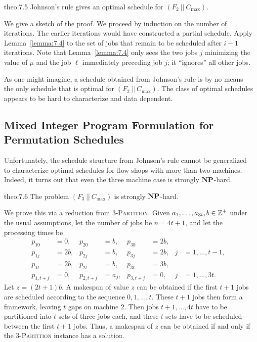 \begin{theo}{theo:7.5}
    Johnson's rule gives an optimal schedule for $(F_2~||~C_{\max})$. 
\end{theo}
\begin{pf}
    We give a sketch of the proof. We proceed by induction on the number 
    of iterations. The earlier iterations would have constructed a 
    partial schedule. Apply Lemma~\ref{lemma:7.4} to the set of jobs 
    that remain to be scheduled after $i-1$ iterations. Note that 
    Lemma~\ref{lemma:7.4} only sees the two jobs $j$ minimizing the 
    value of $\mu$ and the job $\ell$ immediately preceding job $j$; 
    it ``ignores'' all other jobs. 
\end{pf}

As one might imagine, a schedule obtained from Johnson's rule is 
by no means the only schedule that is optimal for $(F_2~||~C_{\max})$. 
The class of optimal schedules appears to be hard to characterize and 
data dependent. 

\subsection{Mixed Integer Program Formulation for Permutation Schedules} \label{subsec:7.3}
Unfortunately, the schedule structure from Johnson's rule cannot be 
generalized to characterize optimal schedules for flow shops with 
more than two machines. Indeed, it turns out that even the three machine case 
is strongly $\operatorname{\textbf{NP}}$-hard. 

\begin{theo}{theo:7.6}
    The problem $(F_3~||~C_{\max})$ is strongly $\operatorname{\textbf{NP}}$-hard. 
\end{theo}
\begin{pf}
    We prove this via a reduction from \textsc{$3$-Partition}. Given 
    $a_1, \dots, a_{3t}, b \in \mathbb{Z}^+$ under the usual assumptions, 
    let the number of jobs be $n = 4t+1$, and let the processing times be 
    \begin{align*}
        p_{10} &= 0, & p_{20} &= b, & p_{30} &= 2b, \\ 
        p_{1j} &= 2b, & p_{2j} &= b, & p_{3j} &= 2b, & j &= 1, \dots, t-1, \\ 
        p_{1t} &= 2b, & p_{2t} &= b, & p_{3t} &= 3b, \\ 
        p_{1,t+j} &= 0, & p_{2,t+j} &= a_j, & p_{3,t+j} &= 0, & j &= 1, \dots, 3t. 
    \end{align*}
    Let $z = (2t+1)b$. A makespan of value $z$ can be obtained if the first 
    $t+1$ jobs are scheduled according to the sequence $0, 1, \dots, t$. 
    These $t+1$ jobs then form a framework, leaving $t$ gaps on machine $2$. 
    Then jobs $t+1, \dots, 4t$ have to be partitioned into $t$ sets of three 
    jobs each, and these $t$ sets have to be scheduled between the first 
    $t+1$ jobs. Thus, a makespan of $z$ can be obtained if and only if 
    the \textsc{$3$-Partition} instance has a solution. 
\end{pf}

